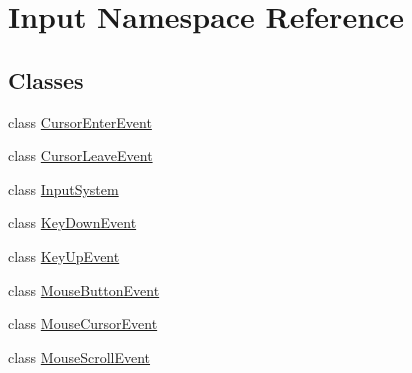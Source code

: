 \hypertarget{namespace_input}{}\section{Input Namespace Reference}
\label{namespace_input}
\subsection*{Classes}
\begin{DoxyCompactItemize}
\item 
class \hyperlink{class_input_1_1_cursor_enter_event}{Cursor\+Enter\+Event}
\item 
class \hyperlink{class_input_1_1_cursor_leave_event}{Cursor\+Leave\+Event}
\item 
class \hyperlink{class_input_1_1_input_system}{Input\+System}
\item 
class \hyperlink{class_input_1_1_key_down_event}{Key\+Down\+Event}
\item 
class \hyperlink{class_input_1_1_key_up_event}{Key\+Up\+Event}
\item 
class \hyperlink{class_input_1_1_mouse_button_event}{Mouse\+Button\+Event}
\item 
class \hyperlink{class_input_1_1_mouse_cursor_event}{Mouse\+Cursor\+Event}
\item 
class \hyperlink{class_input_1_1_mouse_scroll_event}{Mouse\+Scroll\+Event}
\end{DoxyCompactItemize}

